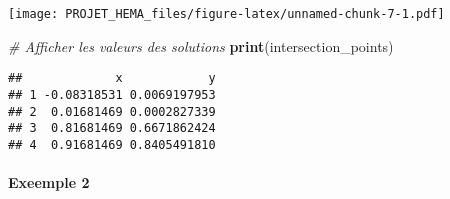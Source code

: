 \documentclass[
]{article}
\newenvironment{Shaded}{\begin{snugshade}}{\end{snugshade}}
\newcommand{\AttributeTok}[1]{\textcolor[rgb]{0.13,0.29,0.53}{#1}}
\newcommand{\CommentTok}[1]{\textcolor[rgb]{0.56,0.35,0.01}{\textit{#1}}}
\newcommand{\DecValTok}[1]{\textcolor[rgb]{0.00,0.00,0.81}{#1}}
\newcommand{\FunctionTok}[1]{\textcolor[rgb]{0.13,0.29,0.53}{\textbf{#1}}}
\newcommand{\NormalTok}[1]{#1}
\newcommand{\SpecialCharTok}[1]{\textcolor[rgb]{0.81,0.36,0.00}{\textbf{#1}}}
\newcommand{\StringTok}[1]{\textcolor[rgb]{0.31,0.60,0.02}{#1}}
\begin{document}
\begin{Shaded}
\end{Shaded}

\texttt{[image: PROJET\_HEMA\_files/figure-latex/unnamed-chunk-7-1.pdf]}

\begin{Shaded}
\begin{Highlighting}[]
\CommentTok{\# Afficher les valeurs des solutions}
\FunctionTok{print}\NormalTok{(intersection\_points)}
\end{Highlighting}
\end{Shaded}

\begin{verbatim}
##             x            y
## 1 -0.08318531 0.0069197953
## 2  0.01681469 0.0002827339
## 3  0.81681469 0.6671862424
## 4  0.91681469 0.8405491810
\end{verbatim}

\hypertarget{exeemple-2}{%
\paragraph{Exeemple 2}\label{exeemple-2}}
\end{document}
